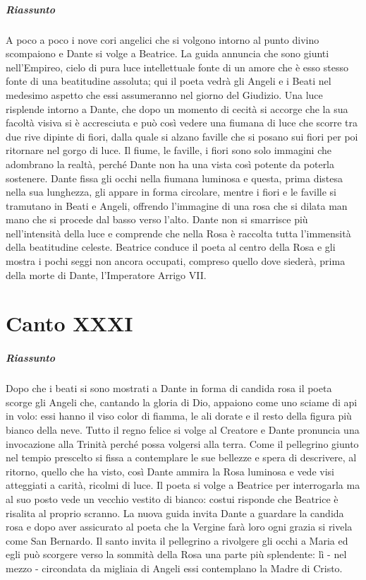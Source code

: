 \documentclass[a4paper, twoside, titlepage]{book}
\newcounter{mar}
\begin{document}
\paragraph{Riassunto} A poco a poco i nove cori angelici che si volgono intorno al punto divino scompaiono e Dante si volge a Beatrice. La guida annuncia che sono giunti nell’Empireo, cielo di pura luce intellettuale fonte di un amore che è esso stesso fonte di una beatitudine assoluta; qui il poeta vedrà gli Angeli e i Beati nel medesimo aspetto che essi assumeranno nel giorno del Giudizio. Una luce risplende intorno a Dante, che dopo un momento di cecità si accorge che la sua facoltà visiva si è accresciuta e può così vedere una fiumana di luce che scorre tra due rive dipinte di fiori, dalla quale si alzano faville che si posano sui fiori per poi ritornare nel gorgo di luce. Il fiume, le faville, i fiori sono solo immagini che adombrano la realtà, perché Dante non ha una vista così potente da poterla sostenere. Dante fissa gli occhi nella fiumana luminosa e questa, prima distesa nella sua lunghezza, gli appare in forma circolare, mentre i fiori e le faville si tramutano in Beati e Angeli, offrendo l’immagine di una rosa che si dilata man mano che si procede dal basso verso l’alto. Dante non si smarrisce più nell’intensità della luce e comprende che nella Rosa è raccolta tutta l’immensità della beatitudine celeste. Beatrice conduce il poeta al centro della Rosa e gli mostra i pochi seggi non ancora occupati, compreso quello dove siederà, prima della morte di Dante, l’Imperatore Arrigo VII.

\chapter{Canto XXXI}

\paragraph{Riassunto} Dopo che i beati si sono mostrati a Dante in forma di candida rosa il poeta scorge gli Angeli che, cantando la gloria di Dio, appaiono come uno sciame di api in volo: essi hanno il viso color di fiamma, le ali dorate e il resto della figura più bianco della neve. Tutto il regno felice si volge al Creatore e Dante pronuncia una invocazione alla Trinità perché possa volgersi alla terra. Come il pellegrino giunto nel tempio prescelto si fissa a contemplare le sue bellezze e spera di descrivere, al ritorno, quello che ha visto, così Dante ammira la Rosa luminosa e vede visi atteggiati a carità, ricolmi di luce. Il poeta si volge a Beatrice per interrogarla ma al suo posto vede un vecchio vestito di bianco: costui risponde che Beatrice è risalita al proprio scranno. La nuova guida invita Dante a guardare la candida rosa e dopo aver assicurato al poeta che la Vergine farà loro ogni grazia si rivela come San Bernardo. Il santo invita il pellegrino a rivolgere gli occhi a Maria ed egli può scorgere verso la sommità della Rosa una parte più splendente: lì - nel mezzo - circondata da migliaia di Angeli essi contemplano la Madre di Cristo.
\end{document}
